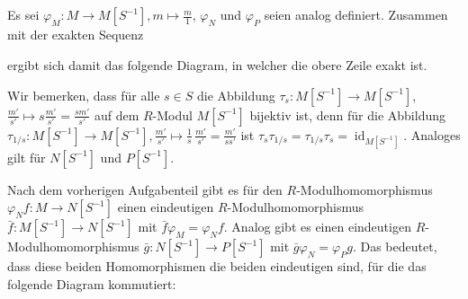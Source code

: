 \documentclass[a4paper,10pt]{article}
\theoremstyle{definition}
\newcommand{\id}{\operatorname{id}}
\begin{document}
\subsection{}
Es sei $\varphi_M : M \rightarrow M[S^{-1}], m \mapsto \frac{m}{1}$, $\varphi_N$ und $\varphi_P$ seien analog definiert. Zusammen mit der exakten Sequenz
\begin{center}
\end{center}
ergibt sich damit das folgende Diagram, in welcher die obere Zeile exakt ist.
\begin{center}
\end{center}
Wir bemerken, dass für alle $s \in S$ die Abbildung $\tau_s: M[S^{-1}] \rightarrow M[S^{-1}]$, $\frac{m'}{s'} \mapsto s \frac{m'}{s'} = \frac{sm'}{s'}$ auf dem $R$-Modul $M[S^{-1}]$ bijektiv ist, denn für die Abbildung $\tau_{1/s} : M[S^{-1}] \rightarrow M[S^{-1}], \frac{m'}{s'} \mapsto \frac{1}{s} \, \frac{m'}{s'} = \frac{m'}{ss'}$ ist $\tau_s \tau_{1/s} = \tau_{1/s} \tau_s = \id_{M[S^{-1}]}$. Analoges gilt für $N[S^{-1}]$ und $P[S^{-1}]$.

Nach dem vorherigen Aufgabenteil gibt es für den $R$-Modulhomomorphismus $\varphi_N f : M \rightarrow N[S^{-1}]$ einen eindeutigen $R$-Modulhomomorphismus $\bar{f} : M[S^{-1}] \rightarrow N[S^{-1}]$ mit $\bar{f} \varphi_M = \varphi_N f$. Analog gibt es einen eindeutigen $R$-Modulhomomorphismus $\bar{g} : N[S^{-1}] \rightarrow P[S^{-1}]$ mit $\bar{g} \varphi_N = \varphi_P g$. Das bedeutet, dass diese beiden Homomorphismen die beiden eindeutigen sind, für die das folgende Diagram kommutiert:
\begin{center}
\end{center}
\end{document}
